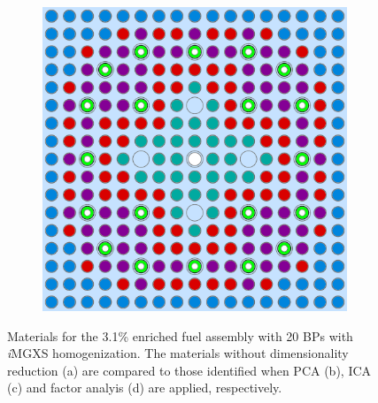 \begin{appendices}
\begin{figure}[h!]
\begin{subfigure}{0.48\textwidth}
  \caption{}
  \label{fig:assm-31-20BPs-combined-ica-2}
\end{subfigure}%
\begin{subfigure}{0.48\textwidth}
  \centering
  \includegraphics[width=0.95\linewidth]{figures/unsupervised/geometries/dimension-reduce/assm-31-20BPs/factor-analysis}
  \caption{}
  \label{fig:assm-31-20BPs-combined-factor-analysis-2}
\end{subfigure}
\caption[Clustered geometries with dimensionality reduction]{Materials for the 3.1\% enriched fuel assembly with 20 \acp{BP} with \textit{i}\ac{MGXS} homogenization. The materials without dimensionality reduction (a) are compared to those identified when PCA (b), ICA (c) and factor analyis (d) are applied, respectively.}
\label{fig:dimension-reduce-assm-31-20BPs-geometries}
\end{figure}

\clearpage


\end{appendices}
